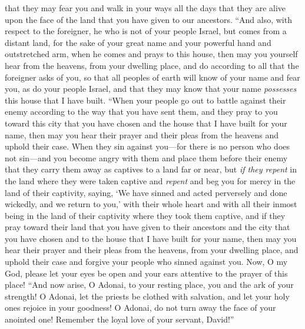 \begin{biblechapter}
\verse that they may fear you and walk in your ways all the days that they are alive upon the face of the land that you have given to our ancestors.
\verse “And also, with respect to the foreigner, he who is not of your people Israel, but comes from a distant land, for the sake of your great name and your powerful hand and outstretched arm, when he comes and prays to this house,
\verse then may you yourself hear from the heavens, from your dwelling place, and do according to all that the foreigner asks of you, so that all peoples of earth will know of your name and fear you, as do your people Israel, and that they may know that your name \textit{possesses} this house that I have built.
\verse “When your people go out to battle against their enemy according to the way that you have sent them, and they pray to you toward this city that you have chosen and the house that I have built for your name,
\verse then may you hear their prayer and their pleas from the heavens and uphold their case.
\verse When they sin against you—for there is no person who does not sin—and you become angry with them and place them before their enemy that they carry them away as captives to a land far or near,
\verse but \textit{if they repent} in the land where they were taken captive and \textit{repent} and beg you for mercy in the land of their captivity, saying, ‘We have sinned and acted perversely and done wickedly,
\verse and we return to you,’ with their whole heart and with all their inmost being in the land of their captivity where they took them captive, and if they pray toward their land that you have given to their ancestors and the city that you have chosen and to the house that I have built for your name,
\verse then may you hear their prayer and their pleas from the heavens, from your dwelling place, and uphold their case and forgive your people who sinned against you.
\verse Now, O my God, please let your eyes be open and your ears attentive to the prayer of this place!
\verse “And now arise, O Adonai, to your resting place, you and the ark of your strength! O Adonai, let the priests be clothed with salvation, and let your holy ones rejoice in your goodness!
\verse O Adonai, do not turn away the face of your anointed one! Remember the loyal love of your servant, David!”
\end{biblechapter}

